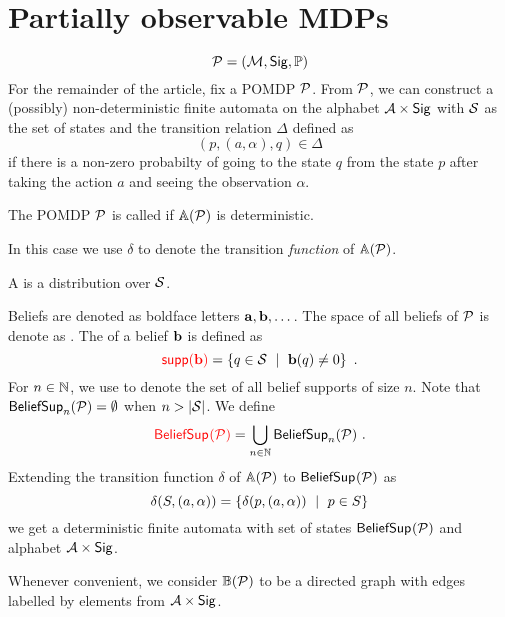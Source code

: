 %
%
%
\section{Partially observable MDPs}
%
\[
\pdp = (\mdp,\sig,\obpr)
\]
%
For the remainder of the article, fix a POMDP $\pdp$. 
From $\pdp$, we can construct a (possibly) non-deterministic finite automata \emphdef{$\aut{\pdp}$} on the alphabet $\ac \times \sig$ with $\st$ as the set of states and the transition relation $\Delta$ defined as
\[
(p,(a,\alpha),q) \in \Delta
\]
if there is a non-zero probabilty of going to the state $q$ from the state $p$ after taking the action $a$ and seeing the observation $\alpha$. 
%
\begin{definition}
The POMDP $\pdp$ is called  if $\aut{\pdp}$ is deterministic.

In this case we use $\delta$ to denote the transition \emph{function} of $\aut{\pdp}$.
\end{definition}
%
\begin{definition}
A  is a distribution over $\st$.
\end{definition}
%
Beliefs are denoted as boldface letters $\bel{a},\bel{b},\dots$.
The space of all beliefs of $\pdp$ is denote as \emphdef{$\bsp{\pdp}$}.
The  of a belief $\bel{b}$ is defined as
\[
\emphdef{$\supp{\bel{b}}$} = 
\setof{q\in\st}{\bel{b}(q)\neq 0} \ .
\]
For $n\in\N$, we use \emphdef{$\bsup[n]{\pdp}$} to denote the set of all belief supports of size $n$.
Note that $\bsup[n]{\pdp} = \emptyset$ when $n > |\st|$.
We define
\[
\emphdef{$\bsup{\pdp}$} = \bigcup_{n\in\N} \bsup[n]{\pdp} \ .
\]
%
Extending the transition function $\delta$ of $\aut{\pdp}$ to $\bsup{\pdp}$ as
\[
\delta(S,(a,\alpha)) =
\setof{\delta(p,(a,\alpha))}{p\in S}
\]
we get a deterministic finite automata \emphdef{$\baut{\pdp}$} with set of states $\bsup{\pdp}$ and alphabet $\ac\times\sig$.

Whenever convenient, we consider $\baut{\pdp}$ to be a directed graph with edges labelled by elements from $\ac\times\sig$.
%